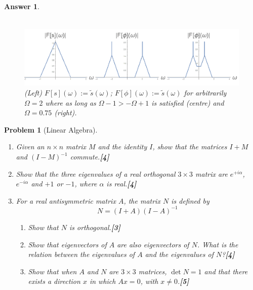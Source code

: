 \documentclass[a4paper]{article}
\newtheorem{ans}{Answer}[section]
\theoremstyle{new}
\newtheorem{qns}{Problem}[section]
\begin{document}
\begin{ans}
\begin{enumerate}[label=(\alph*)]
\begin{eqnarray}
\end{eqnarray}
\begin{figure}[H]
    \centering
    \includegraphics[width=\linewidth]{2016P1Q4.PNG}
    \caption{(Left) $F[s](\omega):=\tilde{s}(\omega)$;  $F[\phi](\omega):=\tilde{s}(\omega)$ for arbitrarily $\Omega=2$ where as long as $\Omega-1>-\Omega+1$ is satisfied (centre) and $\Omega=0.75$ (right).}
\end{figure}
\end{enumerate}
\end{ans}
\begin{qns}[Linear Algebra]\leavevmode
\begin{enumerate}[label=(\alph*)]
\item Given an $n \times n$ matrix $M$ and the identity $I$, show that the matrices $I +M$ and $(I −M)^{−1}$ commute.\hfill\textbf{[4]}
\item Show that the three eigenvalues of a real orthogonal $3\times3$ matrix are $e^{+i\alpha}$, $e^{-i\alpha}$ and $+1$ or $−1$, where $\alpha$ is real.\hfill\textbf{[4]}
\item For a real antisymmetric matrix $A$, the matrix $N$ is defined by
$$N=(I+A)(I-A)^{-1}$$
\begin{enumerate}[label=(\roman*)]
\item Show that $N$ is orthogonal.\hfill\textbf{[3]}
\item Show that eigenvectors of $A$ are also eigenvectors of $N$. What is the relation between the eigenvalues of $A$ and the eigenvalues of $N$?\hfill\textbf{[4]}
\item Show that when $A$ and $N$ are $3\times3$ matrices, $\det N = 1$ and that there exists a direction $x$ in which $Ax = 0$, with $x\neq 0$.\hfill\textbf{[5]}
\end{enumerate}
\end{enumerate}
\end{qns}
\end{document}
